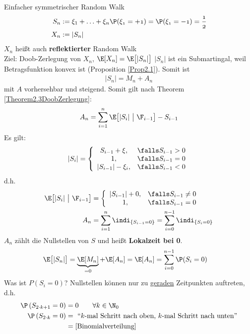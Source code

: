\begin{beisp}
Einfacher symmetrischer Random Walk 
\begin{align*}
S_n&:=\xi_1+\ldots+\xi_n\mit\P(\xi_1=+1)=\P(\xi_1=-1)=\frac{1}{2}\\
X_n&:=|S_n|
\end{align*}
$X_n$ heißt auch \textbf{reflektierter} Random Walk\\
Ziel: Doob-Zerlegung von $X_n$, $\E[X_n]=\E\big[|S_n|\big]$
$|S_n|$ ist ein Submartingal, weil Betragsfunktion konvex ist (Proposition \ref{Prop2.1}). Somit ist
\begin{align*}
|S_n|=M_n+A_n
\end{align*}
mit $A$ vorhersehbar und steigend. Somit gilt nach Theorem \ref{Theorem2.3DoobZerlegung}:
\begin{align*}
A_n=\sum\limits_{i=1}^n \E\big[|S_i|~\big|~\F_{i-1}\big]-S_{i-1}
\end{align*}
Es gilt:
\begin{align*}
|S_i|=\left\lbrace\begin{array}{cl}
S_{i-1}+\xi, & \falls S_{i-1}>0\\
1, &\falls S_{i-1}=0\\
|S_{i-1}|-\xi_i, &\falls S_{i-1}<0
\end{array}\right.
\end{align*}
d.h.
\begin{align*}
\E\big[|S_i|~\big|~\F_{i-1}\big]&=\left\lbrace\begin{array}{cl}
|S_{i-1}|+0, &\falls S_{i-1}\neq0\\
1, &\falls S_{i-1}=0
\end{array}\right.\\
A_n&=\sum\limits_{i=1}^n\indi_{\lbrace S_{i-1}=0\rbrace}=\sum\limits_{i=0}^{n-1}\indi_{\lbrace S_i=0\rbrace}
\end{align*}
$A_n$ zählt die Nullstellen von $S$ und heißt \textbf{Lokalzeit bei 0}.
\begin{align*}
\E\big[|S_n|\big]&=
\underbrace{\E[M_n]}_{=0}+\E[A_n]
=\E[A_n]
=\sum\limits_{i=0}^{n-1}\P(S_i=0)
\end{align*}
Was ist $P(S_i=0)$? Nullstellen können nur zu \ul{geraden} Zeitpunkten auftreten, d.h.
\begin{align*}
\P\left(S_{2\cdot k+1}=0\right)&=0\qquad\forall k\in\N_0\\
\P\left(S_{2\cdot k}=0\right)&=\text{ ``$k$-mal Schritt nach oben, $k$-mal Schritt nach unten''}\\
&=[\text{Binomialverteilung]}\\

\end{align*}
\end{beisp}

